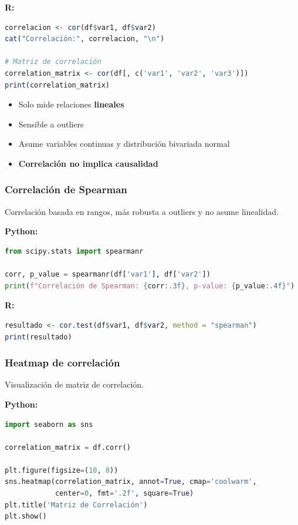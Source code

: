\documentclass[a4paper,11pt]{article}
\begin{document}
\textbf{R:}
\begin{lstlisting}[language=R]
correlacion <- cor(df$var1, df$var2)
cat("Correlación:", correlacion, "\n")

# Matriz de correlación
correlation_matrix <- cor(df[, c('var1', 'var2', 'var3')])
print(correlation_matrix)
\end{lstlisting}

\begin{tcolorbox}[colback=advertenciacolor!20, colframe=red, title=Limitaciones de la correlación de Pearson]
\begin{itemize}
    \item Solo mide relaciones \textbf{lineales}
    \item Sensible a outliers
    \item Asume variables continuas y distribución bivariada normal
    \item \textbf{Correlación no implica causalidad}
\end{itemize}
\end{tcolorbox}

\subsubsection{Correlación de Spearman}

Correlación basada en rangos, más robusta a outliers y no asume linealidad.

\textbf{Python:}
\begin{lstlisting}[language=Python]
from scipy.stats import spearmanr

corr, p_value = spearmanr(df['var1'], df['var2'])
print(f"Correlación de Spearman: {corr:.3f}, p-value: {p_value:.4f}")
\end{lstlisting}

\textbf{R:}
\begin{lstlisting}[language=R]
resultado <- cor.test(df$var1, df$var2, method = "spearman")
print(resultado)
\end{lstlisting}

\subsubsection{Heatmap de correlación}

Visualización de matriz de correlación.

\textbf{Python:}
\begin{lstlisting}[language=Python]
import seaborn as sns

correlation_matrix = df.corr()

plt.figure(figsize=(10, 8))
sns.heatmap(correlation_matrix, annot=True, cmap='coolwarm', 
            center=0, fmt='.2f', square=True)
plt.title('Matriz de Correlación')
plt.show()
\end{lstlisting}
\end{document}
